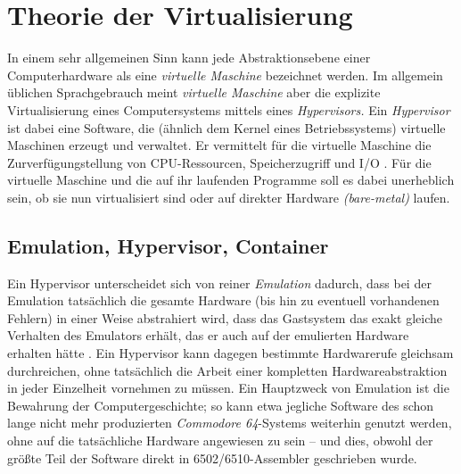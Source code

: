 
\chapter{Theorie der Virtualisierung}
In einem sehr allgemeinen Sinn kann jede Abstraktionsebene einer Computerhardware als eine \textit{virtuelle Maschine} bezeichnet werden.\cite[3]{tanenbaum2016structured}
Im allgemein üblichen Sprachgebrauch meint \textit{virtuelle Maschine} aber die explizite Virtualisierung eines Computersystems mittels eines \textit{Hypervisors.}
Ein \textit{Hypervisor} ist dabei eine Software, die (ähnlich dem Kernel eines Betriebssystems) virtuelle Maschinen erzeugt und verwaltet. Er vermittelt für die virtuelle Maschine die Zurverfügungstellung von \acs{CPU}-Ressourcen, Speicherzugriff und \acs{I/O} \cite[457]{tanenbaum2016structured}.
Für die virtuelle Maschine und die auf ihr laufenden Programme soll es dabei unerheblich sein, ob sie nun virtualisiert sind oder auf direkter Hardware \textit{(bare-metal)} laufen. 

\section{Emulation, Hypervisor, Container}
Ein Hypervisor unterscheidet sich von reiner \textit{Emulation} dadurch, dass bei der Emulation tatsächlich die gesamte Hardware (bis hin zu eventuell vorhandenen Fehlern) in einer Weise abstrahiert wird, dass das Gastsystem das exakt gleiche Verhalten des Emulators erhält, das er auch auf der emulierten Hardware erhalten hätte \cite{emulationorvirtualizationdell}.
Ein Hypervisor kann dagegen bestimmte Hardwarerufe gleichsam \glqq durchreichen\grqq{}, ohne tatsächlich die Arbeit einer kompletten Hardwareabstraktion in jeder Einzelheit vornehmen zu müssen.
Ein Hauptzweck von Emulation ist die Bewahrung der Computergeschichte; so kann etwa jegliche Software des schon lange nicht mehr produzierten \textit{Commodore 64}-Systems weiterhin genutzt werden, ohne auf die tatsächliche Hardware angewiesen zu sein -- und dies, obwohl der größte Teil der Software direkt in 6502/6510-Assembler geschrieben wurde.

